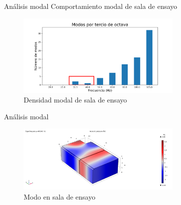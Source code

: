 \documentclass{sintefbeamer}
\begin{document}
\begin{frame}{Análisis modal}
    Comportamiento modal de sala de ensayo
    \begin{figure}
        \centering
        \includegraphics[width=8cm]{images/Modos/densidad modal.png}
        \caption{Densidad modal de sala de ensayo}
        \label{fig:densidad modal}
    \end{figure}
\end{frame}
\begin{frame}{Análisis modal}
    \begin{figure}
        \centering
        \includegraphics[width=8cm]{images/Modos/modo_48hz.png}
        \caption{Modo en sala de ensayo}
        \label{fig:modo 48 hz}
    \end{figure}
\end{frame}
\end{document}
